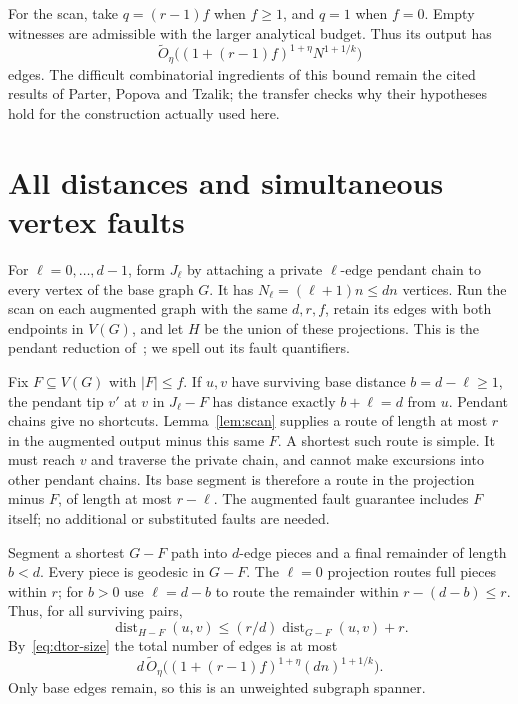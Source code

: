 \documentclass[acmsmall,11pt,screen,nonacm]{acmart}
\newcommand{\dist}{\operatorname{dist}}
\newcommand{\Ot}{\widetilde{O}}
\begin{document}
For the scan, take $q=(r-1)f$ when $f\ge1$, and $q=1$ when $f=0$.
Empty witnesses are admissible with the larger analytical budget. Thus
its output has
\begin{equation}\label{eq:dtor-size}
 \Ot_\eta\bigl((1+(r-1)f)^{1+\eta}N^{1+1/k}\bigr)
\end{equation}
edges. The difficult combinatorial ingredients of this bound remain
the cited results of Parter, Popova and Tzalik; the transfer checks why
their hypotheses hold for the construction actually used here.

\section{All distances and simultaneous vertex faults}\label{sec:scales}

For $\ell=0,\ldots,d-1$, form $J_\ell$ by attaching a private
$\ell$-edge pendant chain to every vertex of the base graph $G$.
It has $N_\ell=(\ell+1)n\le dn$ vertices. Run the scan on each augmented
graph with the same $d,r,f$, retain its edges with both endpoints in
$V(G)$, and let $H$ be the union of these projections. This is the
pendant reduction of~\cite[Appendix B]{PPT26}; we spell out its fault
quantifiers.

Fix $F\subseteq V(G)$ with $|F|\le f$. If $u,v$ have surviving base
distance $b=d-\ell\ge1$, the pendant tip $v'$ at $v$ in $J_\ell-F$ has
distance exactly $b+\ell=d$ from $u$. Pendant chains give no shortcuts.
Lemma~\ref{lem:scan} supplies a route of length at most $r$ in the augmented
output minus this same $F$. A shortest such route is simple. It must reach
$v$ and traverse the private chain, and cannot make excursions into other
pendant chains. Its base segment is therefore a route in the projection
minus $F$, of length at most $r-\ell$. The augmented fault guarantee
includes $F$ itself; no additional or substituted faults are needed.

Segment a shortest $G-F$ path into $d$-edge pieces and a final remainder
of length $b<d$. Every piece is geodesic in $G-F$. The $\ell=0$ projection
routes full pieces within $r$; for $b>0$ use $\ell=d-b$ to route the
remainder within $r-(d-b)\le r$. Thus, for all surviving pairs,
\begin{equation}\label{eq:stretch}
 \dist_{H-F}(u,v)\le(r/d)\dist_{G-F}(u,v)+r.
\end{equation}
By~\eqref{eq:dtor-size} the total number of edges is at most
\begin{equation}\label{eq:scales-size}
 d\,\Ot_\eta\bigl((1+(r-1)f)^{1+\eta}(dn)^{1+1/k}\bigr).
\end{equation}
Only base edges remain, so this is an unweighted subgraph spanner.
\end{document}
